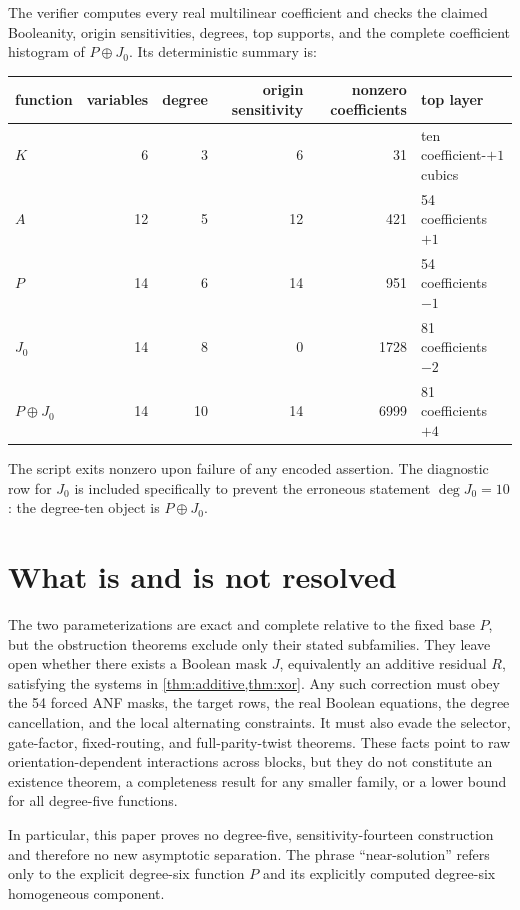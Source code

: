 \documentclass[11pt]{article}
\theoremstyle{definition}
\begin{document}
The verifier computes every real multilinear coefficient and checks the
claimed Booleanity, origin sensitivities, degrees, top supports, and the
complete coefficient histogram of \(P\oplus J_0\).  Its deterministic summary
is:
\begin{center}
\begingroup
\small
\setlength{\tabcolsep}{5pt}
\begin{tabular}{lrrrrl}
\toprule
function & variables & degree & origin sensitivity & nonzero coefficients
& top layer\\
\midrule
\(K\)            & 6  & 3  & 6  & 31   & ten coefficient-\(+1\) cubics\\
\(A\)            & 12 & 5  & 12 & 421  & 54 coefficients \(+1\)\\
\(P\)            & 14 & 6  & 14 & 951  & 54 coefficients \(-1\)\\
\(J_0\)          & 14 & 8  & 0  & 1728 & 81 coefficients \(-2\)\\
\(P\oplus J_0\) & 14 & 10 & 14 & 6999 & 81 coefficients \(+4\)\\
\bottomrule
\end{tabular}
\endgroup
\end{center}
The script exits nonzero upon failure of any encoded assertion.  The
diagnostic row for \(J_0\) is included specifically to prevent the erroneous statement
\(\deg J_0=10\): the degree-ten object is \(P\oplus J_0\).

\section{What is and is not resolved}

The two parameterizations are exact and complete relative to the fixed base
\(P\), but the obstruction theorems exclude only their stated subfamilies.
They leave open whether there exists a Boolean mask \(J\), equivalently an
additive residual \(R\), satisfying the systems in
\cref{thm:additive,thm:xor}.  Any such correction must obey the 54 forced ANF
masks, the target rows, the real Boolean equations, the degree cancellation,
and the local alternating constraints.  It must also evade the selector,
gate-factor, fixed-routing, and full-parity-twist theorems.  These facts point
to raw orientation-dependent interactions across blocks, but they do not
constitute an existence theorem, a completeness result for any smaller
family, or a lower bound for all degree-five functions.

In particular, this paper proves no degree-five, sensitivity-fourteen
construction and therefore no new asymptotic separation.  The phrase
``near-solution'' refers only to the explicit degree-six function \(P\) and
its explicitly computed degree-six homogeneous component.
\end{document}
